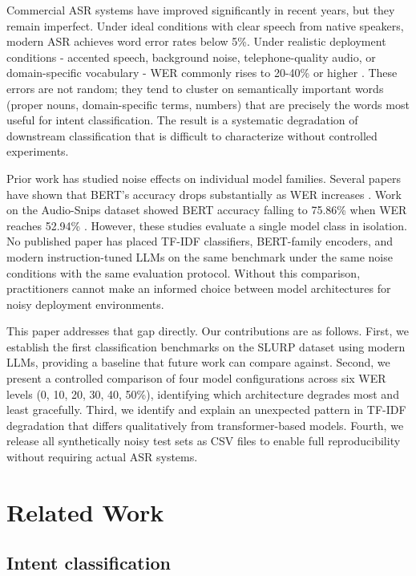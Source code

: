 \documentclass[11pt,a4paper]{article}
\begin{document}
Commercial ASR systems have improved significantly in recent years, but they remain imperfect. Under ideal conditions with clear speech from native speakers, modern ASR achieves word error rates below 5\%. Under realistic deployment conditions - accented speech, background noise, telephone-quality audio, or domain-specific vocabulary - WER commonly rises to 20-40\% or higher \citep{watanabe2017hybrid}. These errors are not random; they tend to cluster on semantically important words (proper nouns, domain-specific terms, numbers) that are precisely the words most useful for intent classification. The result is a systematic degradation of downstream classification that is difficult to characterize without controlled experiments.

Prior work has studied noise effects on individual model families. Several papers have shown that BERT's accuracy drops substantially as WER increases \citep{faruqui2021revisiting}. Work on the Audio-Snips dataset showed BERT accuracy falling to 75.86\% when WER reaches 52.94\% \citep{audio_snips_paper}. However, these studies evaluate a single model class in isolation. No published paper has placed TF-IDF classifiers, BERT-family encoders, and modern instruction-tuned LLMs on the same benchmark under the same noise conditions with the same evaluation protocol. Without this comparison, practitioners cannot make an informed choice between model architectures for noisy deployment environments.

This paper addresses that gap directly. Our contributions are as follows. First, we establish the first classification benchmarks on the SLURP dataset \citep{bastianelli2020slurp} using modern LLMs, providing a baseline that future work can compare against. Second, we present a controlled comparison of four model configurations across six WER levels (0, 10, 20, 30, 40, 50\%), identifying which architecture degrades most and least gracefully. Third, we identify and explain an unexpected pattern in TF-IDF degradation that differs qualitatively from transformer-based models. Fourth, we release all synthetically noisy test sets as CSV files to enable full reproducibility without requiring actual ASR systems.

\section{Related Work}

\subsection{Intent classification}
\end{document}
